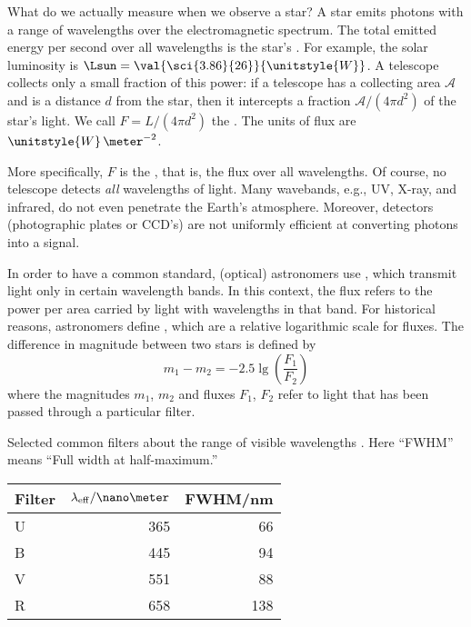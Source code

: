 
What do we actually measure when we observe a star? A star emits photons with a range of wavelengths over the electromagnetic spectrum.  The total emitted energy per second over all wavelengths is the star's .  For example, the solar luminosity is $\Lsun = \val{\sci{3.86}{26}}{\unitstyle{W}}$.  A telescope collects only a small fraction of this power: if a telescope has a collecting area $\mathcal{A}$ and is a distance $d$ from the star, then it intercepts a fraction $\mathcal{A}/(4\pi d^{2})$ of the star's light.  We call $F = L/(4\pi d^{2})$ the . The units of flux are $\unitstyle{W}\,\meter^{-2}$.

More specifically, $F$ is the , that is, the flux over all wavelengths.  Of course, no telescope detects \emph{all} wavelengths of light. Many wavebands, e.g., UV, X-ray, and infrared, do not even penetrate the Earth's atmosphere.  Moreover, detectors (photographic plates or CCD's) are not uniformly efficient at converting photons into a signal.

In order to have a common standard, (optical) astronomers use , which transmit light only in certain wavelength bands. In this context, the flux refers to the power per area carried by light with wavelengths in that band.  For historical reasons, astronomers define , which are a relative logarithmic scale for fluxes.  The difference in magnitude between two stars is defined by
\begin{equation}\label{e.magnitude-def}
	m_{1} - m_{2} = -2.5\lg\left(\frac{F_{1}}{F_{2}}\right)
\end{equation}
where the magnitudes $m_{1}$, $m_{2}$ and fluxes $F_{1}$, $F_{2}$ refer to light that has been passed through a particular filter.

\begin{margintable}
\label{t.ubvr}\caption[Properties of common filters]{Selected common filters about the range of visible wavelengths \citep{Binney1998Galactic-Astron}.  Here ``FWHM'' means ``Full width at half-maximum.''}
\begin{tabular}{lrr}
\hline
Filter & $\lambda_{\mathrm{eff}}/\nano\meter$ & FWHM/nm \\
\hline\hline
U & 365 &  66\\
B & 445 &  94\\
V & 551 &  88\\
R & 658 & 138\\
\hline
\end{tabular}
\end{margintable}

